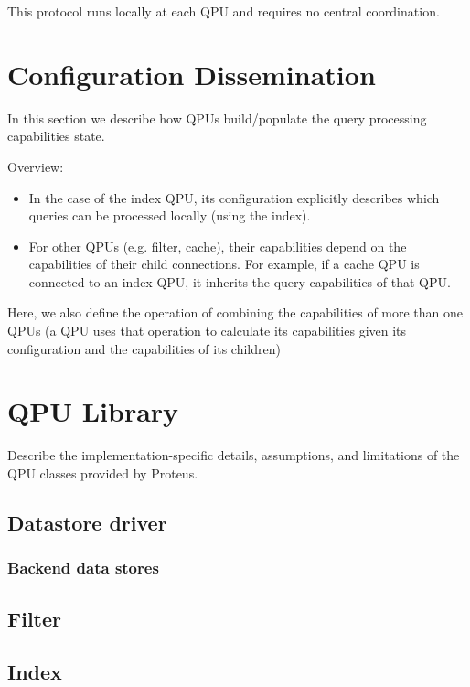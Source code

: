 This protocol runs locally at each QPU and requires no central coordination.

\section{Configuration Dissemination}
In this section we describe how QPUs build/populate the query processing capabilities state.

Overview:
\begin{itemize}
  \item In the case of the index QPU, its configuration explicitly describes which queries can be processed locally
  (using the index).
  \item For other QPUs (e.g. filter, cache), their capabilities depend on the capabilities of their child connections.
  For example, if a cache QPU is connected to an index QPU, it inherits the query capabilities of that QPU.
\end{itemize}

Here, we also define the operation of combining the capabilities of more than one QPUs (a QPU uses that operation to
calculate its capabilities given its configuration and the capabilities of its children)


\section{QPU Library}
Describe the implementation-specific details, assumptions, and limitations of
the QPU classes provided by Proteus.

\subsection{Datastore driver}
\subsubsection{Backend data stores}

\subsection{Filter}

\subsection{Index}

